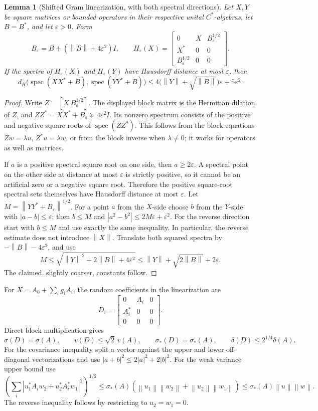 \documentclass[11pt,a4paper]{article}
\newcommand{\norm}[1]{\left\lVert#1\right\rVert}
\newtheorem{lemma}[theorem]{Lemma}
\begin{document}
\begin{lemma}[Shifted Gram linearization, with both spectral directions]
Let \(X,Y\) be square matrices or bounded operators in their respective
unital \(C^*\)-algebras, let \(B=B^*\), and let \(\varepsilon>0\).  Form
\[
 B_\varepsilon=B+(\norm B+4\varepsilon^2)I,\qquad
 H_\varepsilon(X)=
 \begin{bmatrix}0&X&B_\varepsilon^{1/2}\\
 X^*&0&0\\B_\varepsilon^{1/2}&0&0\end{bmatrix}.
\]
If the spectra of \(H_\varepsilon(X)\) and \(H_\varepsilon(Y)\) have
Hausdorff distance at most \(\varepsilon\), then
\[
 d_H\bigl(\operatorname{spec}(XX^*+B),
          \operatorname{spec}(YY^*+B)\bigr)
 \leq4\bigl(\norm Y+\sqrt{\norm B}\bigr)\varepsilon+5\varepsilon^2.
\]
\end{lemma}
\begin{proof}
Write \(Z=[X\ B_\varepsilon^{1/2}]\).  The displayed block matrix is the
Hermitian dilation of \(Z\), and \(ZZ^*=XX^*+B_\varepsilon\succeq
4\varepsilon^2I\).  Its nonzero spectrum consists of the positive and
negative square roots of \(\operatorname{spec}(ZZ^*)\).  This follows from
the block equations \(Zw=\lambda u\), \(Z^*u=\lambda w\), or from the block
inverse when \(\lambda\neq0\); it works for operators as well as matrices.

If \(a\) is a positive spectral square root on one side, then
\(a\geq2\varepsilon\).  A spectral point on the other side at distance at
most \(\varepsilon\) is strictly positive, so it cannot be an artificial
zero or a negative square root.  Therefore the positive square-root spectral
sets themselves have Hausdorff distance at most \(\varepsilon\).
Let
\(M=\norm{YY^*+B_\varepsilon}^{1/2}\).
For a point \(a\) from the \(X\)-side choose \(b\) from the \(Y\)-side with
\(|a-b|\leq\varepsilon\); then \(b\leq M\) and
\(|a^2-b^2|\leq2M\varepsilon+\varepsilon^2\).
For the reverse direction start with \(b\leq M\) and use exactly the same
inequality.  In particular, the reverse estimate does not introduce
\(\norm X\).
Translate both squared spectra by \(-\norm B-4\varepsilon^2\), and use
\[
 M\leq\sqrt{\norm Y^2+2\norm B+4\varepsilon^2}
 \leq\norm Y+\sqrt{2\norm B}+2\varepsilon.
\]
The claimed, slightly coarser, constants follow.
\end{proof}

For \(X=A_0+\sum_i g_iA_i\), the random coefficients in the linearization
are
\[
 D_i=\begin{bmatrix}0&A_i&0\\A_i^*&0&0\\0&0&0\end{bmatrix}.
\]
Direct block multiplication gives
\[
 \sigma(D)=\sigma(A),\qquad v(D)\leq\sqrt2\,v(A),\qquad
 \sigma_*(D)=\sigma_*(A),\qquad
 \delta(D)\leq2^{1/4}\delta(A).
\]
For the covariance inequality split a vector against the upper and lower
off-diagonal vectorizations and use \(|a+b|^2\leq2|a|^2+2|b|^2\).
For the weak variance upper bound use
\[
 \left(\sum_i|u_1^*A_iw_2+u_2^*A_i^*w_1|^2\right)^{1/2}
 \leq\sigma_*(A)
  (\norm{u_1}\norm{w_2}+\norm{u_2}\norm{w_1})
 \leq\sigma_*(A)\norm u\norm w.
\]
The reverse inequality follows by restricting to \(u_2=w_1=0\).
\end{document}
